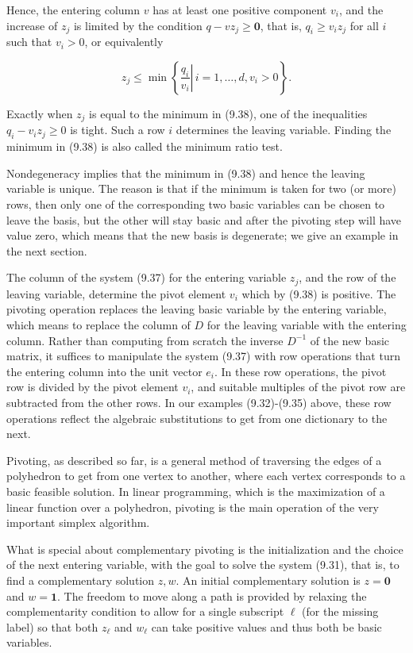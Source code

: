 \documentclass[12pt]{article}
\begin{document}
Hence, the entering column $v$ has at least one positive component $v_{i}$, and the increase of $z_{j}$ is limited by the condition $q-v z_{j} \geq \mathbf{0}$, that is, $q_{i} \geq v_{i} z_{j}$ for all $i$ such that $v_{i}>0$, or equivalently


\begin{equation*}
z_{j} \leq \min \left\{\left.\frac{q_{i}}{v_{i}} \right\rvert\, i=1, \ldots, d, v_{i}>0\right\} . \tag{9.38}
\end{equation*}


Exactly when $z_{j}$ is equal to the minimum in (9.38), one of the inequalities $q_{i}-v_{i} z_{j} \geq 0$ is tight. Such a row $i$ determines the leaving variable. Finding the minimum in (9.38) is also called the minimum ratio test.

Nondegeneracy implies that the minimum in (9.38) and hence the leaving variable is unique. The reason is that if the minimum is taken for two (or more) rows, then only one of the corresponding two basic variables can be chosen to leave the basis, but the other will stay basic and after the pivoting step will have value zero, which means that the new basis is degenerate; we give an example in the next section.

The column of the system (9.37) for the entering variable $z_{j}$, and the row of the leaving variable, determine the pivot element $v_{i}$ which by (9.38) is positive. The pivoting operation replaces the leaving basic variable by the entering variable, which means to replace the column of $D$ for the leaving variable with the entering column. Rather than computing from scratch the inverse $D^{-1}$ of the new basic matrix, it suffices to manipulate the system (9.37) with row operations that turn the entering column into the unit vector $e_{i}$. In these row operations, the pivot row is divided by the pivot element $v_{i}$, and suitable multiples of the pivot row are subtracted from the other rows. In our examples (9.32)-(9.35) above, these row operations reflect the algebraic substitutions to get from one dictionary to the next.

Pivoting, as described so far, is a general method of traversing the edges of a polyhedron to get from one vertex to another, where each vertex corresponds to a basic feasible solution. In linear programming, which is the maximization of a linear function over a polyhedron, pivoting is the main operation of the very important simplex algorithm.

What is special about complementary pivoting is the initialization and the choice of the next entering variable, with the goal to solve the system (9.31), that is, to find a complementary solution $z, w$. An initial complementary solution is $z=\mathbf{0}$ and $w=\mathbf{1}$. The freedom to move along a path is provided by relaxing the complementarity condition to allow for a single subscript $\ell$ (for the missing label) so that both $z_{\ell}$ and $w_{\ell}$ can take positive values and thus both be basic variables.
\end{document}

